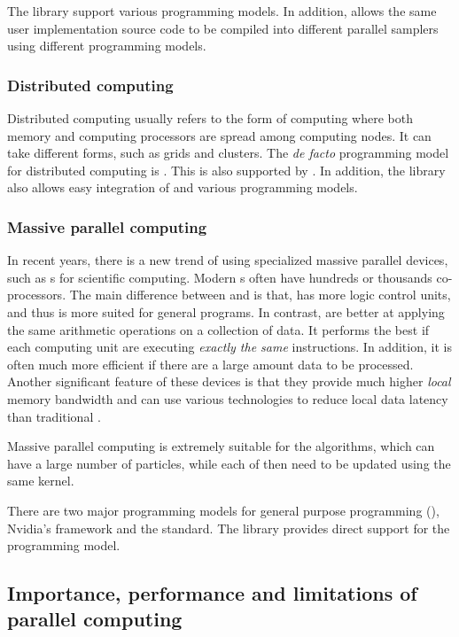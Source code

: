 The \vsmc library support various \smp programming models. In addition, \vsmc
allows the same user implementation source code to be compiled into different
parallel samplers using different programming models.

\subsubsection{Distributed computing}
\label{ssub:Distributed computing}

Distributed computing usually refers to the form of computing where both
memory and computing processors are spread among computing nodes. It can take
different forms, such as grids and clusters. The \emph{de facto} programming
model for distributed computing is \mpi. This is also supported by \vsmc. In
addition, the library also allows easy integration of \mpi and various \smp
programming models.

\subsubsection{Massive parallel computing}
\label{ssub:Massive parallel computing}

In recent years, there is a new trend of using specialized massive parallel
devices, such as \gpu{}s for scientific computing. Modern \gpu{}s often have
hundreds or thousands co-processors. The main difference between \gpu and \cpu
is that, \cpu has more logic control units, and thus is more suited for
general programs. In contrast, \gpu are better at applying the same arithmetic
operations on a collection of data. It performs the best if each computing
unit are executing \emph{exactly the same} instructions. In addition, it is
often much more efficient if there are a large amount data to be processed.
Another significant feature of these devices is that they provide much higher
\emph{local} memory bandwidth and can use various technologies to reduce local
data latency than traditional \cpu.

Massive parallel computing is extremely suitable for the \smc algorithms,
which can have a large number of particles, while each of then need to be
updated using the same \mcmc kernel.

There are two major programming models for general purpose \gpu programming
(\gpgpu), Nvidia's \cuda framework and the \opencl \cite{opencl} standard. The
\vsmc library provides direct support for the \opencl programming model.

\subsection{Importance, performance and limitations of parallel computing}
\label{sub:Importance, performnace and limitations of parallel computing}

